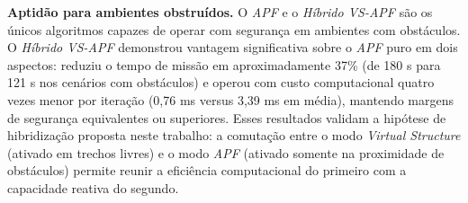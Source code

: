 \textbf{Aptidão para ambientes obstruídos.} O \textit{APF} e o \textit{Híbrido VS-APF} são os únicos algoritmos capazes de operar com segurança em ambientes com obstáculos. O \textit{Híbrido VS-APF} demonstrou vantagem significativa sobre o \textit{APF} puro em dois aspectos: reduziu o tempo de missão em aproximadamente 37\% (de 180 s para 121 s nos cenários com obstáculos) e operou com custo computacional quatro vezes menor por iteração (0,76 ms versus 3,39 ms em média), mantendo margens de segurança equivalentes ou superiores. Esses resultados validam a hipótese de hibridização proposta neste trabalho: a comutação entre o modo \textit{Virtual Structure} (ativado em trechos livres) e o modo \textit{APF} (ativado somente na proximidade de obstáculos) permite reunir a eficiência computacional do primeiro com a capacidade reativa do segundo.
